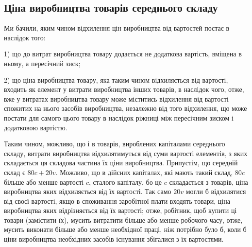 
\subsection{Ціна виробництва товарів середнього складу}

Ми бачили, яким чином відхилення цін виробництва від вартостей постає в наслідок того:

1) що до витрат виробництва товару додається не додаткова вартість, вміщена в ньому, а
пересічний зиск;

2) що ціна виробництва товару, яка таким чином відхиляється від вартості, входить як елемент
у витрати виробництва інших товарів, в наслідок чого, отже, вже у витратах виробництва товару може
міститись відхилення від вартості спожитих на нього засобів виробництва, незалежно від того
відхилення, що може постати для самого цього товару в наслідок ріжниці між пересічним зиском і
додатковою вартістю.

Таким чином, можливо, що і в товарів, вироблених капіталами середнього складу, витрати виробництва
відхилятимуться від суми вартості елементів, з яких складається ця складова частина їх ціни
виробництва. Припустім, що середній склад є $80 c + 20 v$. Можливо, що в дійсних капіталах, які мають
такий склад, $80  c$ більше або менше вартості $c$, сталого капіталу, бо це $c$ складається з товарів,
ціна виробництва яких відхиляється від їх вартості. Так само $20 v$  могли б відхилятися від своєї
вартості, якщо в споживання заробітної плати входять товари, ціна виробництва яких відрізняється від
їх вартості; отже, робітник, щоб купити ці товари (замістити їх), мусить витратити більше або менше
робочого часу, отже, мусить виконати більше або менше необхідної праці, ніж потрібно було б, коли б
ціни виробництва
необхідних засобів існування збігалися з їх вартостями.

